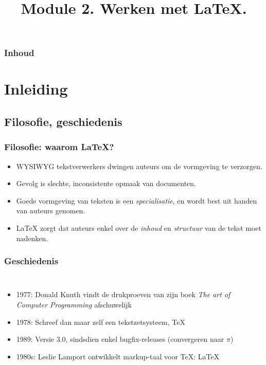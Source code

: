 \documentclass[aspectratio=169]{beamer}
\title{Module 2. Werken met \LaTeX.}
\subtitle{\coursename}
\author{\lecturers}   %
\date{\academicyear}
\begin{document}
\begin{frame}
  \maketitle
\end{frame}

\begin{frame}
  \frametitle{Inhoud}

  \tableofcontents
\end{frame}

\section{Inleiding}

\subsection{Filosofie, geschiedenis}

\begin{frame}
  \frametitle{Filosofie: waarom {\LaTeX}?}

  \begin{itemize}
    \item<+-> WYSIWYG tekstverwerkers dwingen auteurs om de vormgeving te verzorgen.
    \item<+-> Gevolg is slechte, inconsistente opmaak van documenten.
    \item<+-> Goede vormgeving van teksten is een \textit{specialisatie}, en wordt best
    uit handen van auteurs genomen.
    \item<+-> {\LaTeX} zorgt dat auteurs enkel over de \textit{inhoud} en \textit{structuur} van de tekst moet nadenken.
  \end{itemize}
\end{frame}

\begin{frame}[plain]
  \frametitle{Geschiedenis}

  \begin{columns}[c]

    \begin{itemize}
      \item<+-> 1977: Donald Knuth vindt de drukproeven van zijn boek \textit{The art of Computer Programming} afschuwelijk
      \item<+-> 1978: Schreef dan maar zelf een tekstzetsysteem, {\TeX}
      \item<+-> 1989: Versie 3.0, sindsdien enkel bugfix-releases (convergeren naar \(\pi\))
      \item<+-> 1980s: Leslie Lamport ontwikkelt markup-taal voor {\TeX}: {\LaTeX}
    \end{itemize}

    \begin{center}
    \end{center}

  \end{columns}
\end{frame}
\end{document}
